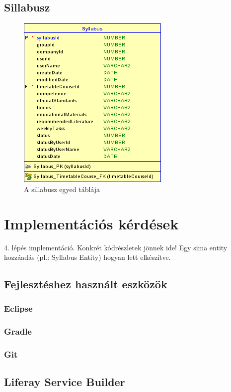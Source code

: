 \documentclass[hidelinks, 12pt, a4paper]{report}
\begin{document}
\subsection{Sillabusz}

\begin{figure}[H]
    \centering
	\includegraphics{syllabus.png}
	\caption{A sillabusz egyed táblája}
\end{figure}

\section{Implementációs kérdések}

4. lépés implementáció. Konkrét kódrészletek jönnek ide! Egy sima entity hozzáadás (pl.: Syllabus Entity) hogyan lett elkészítve.

\subsection{Fejlesztéshez használt eszközök}

\subsubsection{Eclipse}

\subsubsection{Gradle}

\subsubsection{Git}

\subsection{Liferay Service Builder}
\end{document}

